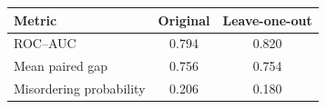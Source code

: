 \begin{tabular}{lcc}
\toprule
Metric & Original & Leave-one-out \\
\midrule
ROC--AUC & 0.794 & 0.820 \\
Mean paired gap & 0.756 & 0.754 \\
Misordering probability & 0.206 & 0.180 \\
\bottomrule
\end{tabular}
